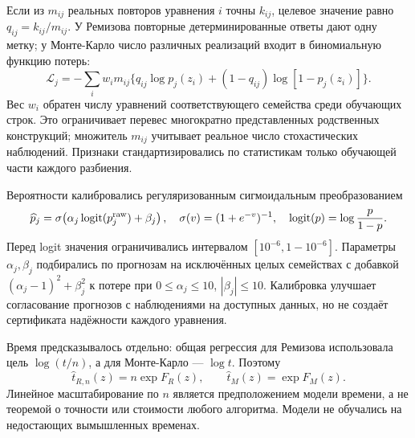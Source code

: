Если из $m_{ij}$ реальных повторов уравнения $i$ точны $k_{ij}$, целевое значение равно $q_{ij}=k_{ij}/m_{ij}$. У Ремизова повторные детерминированные ответы дают одну метку; у Монте-Карло число различных реализаций входит в биномиальную функцию потерь:
\begin{equation}\label{eq:loss}
\mathcal L_j=-\sum_i w_i m_{ij}\{q_{ij}\log p_j(z_i)+(1-q_{ij})\log[1-p_j(z_i)]\}.
\end{equation}
Вес $w_i$ обратен числу уравнений соответствующего семейства среди обучающих строк. Это ограничивает перевес многократно представленных родственных конструкций; множитель $m_{ij}$ учитывает реальное число стохастических наблюдений. Признаки стандартизировались по статистикам только обучающей части каждого разбиения.

Вероятности калибровались регуляризованным сигмоидальным преобразованием
\begin{equation}\label{eq:calibration}
\widehat p_j=\sigma\!\left(\alpha_j\operatorname{logit}(p_j^{\rm raw})+\beta_j\right),\quad
\sigma(v)=(1+e^{-v})^{-1},\quad\operatorname{logit}(p)=\log\frac p{1-p}.
\end{equation}
Перед logit значения ограничивались интервалом $[10^{-6},1-10^{-6}]$. Параметры $\alpha_j,\beta_j$ подбирались по прогнозам на исключённых целых семействах с добавкой $(\alpha_j-1)^2+\beta_j^2$ к потере при $0\le\alpha_j\le10$, $|\beta_j|\le10$. Калибровка улучшает согласование прогнозов с наблюдениями на доступных данных, но не создаёт сертификата надёжности каждого уравнения.

Время предсказывалось отдельно: общая регрессия для Ремизова использовала цель $\log(t/n)$, а для Монте-Карло --- $\log t$. Поэтому
\begin{equation}\label{eq:time}
\widehat t_{R,n}(z)=n\exp F_R(z),\qquad\widehat t_M(z)=\exp F_M(z).
\end{equation}
Линейное масштабирование по $n$ является предположением модели времени, а не теоремой о точности или стоимости любого алгоритма. Модели не обучались на недостающих вымышленных временах.

